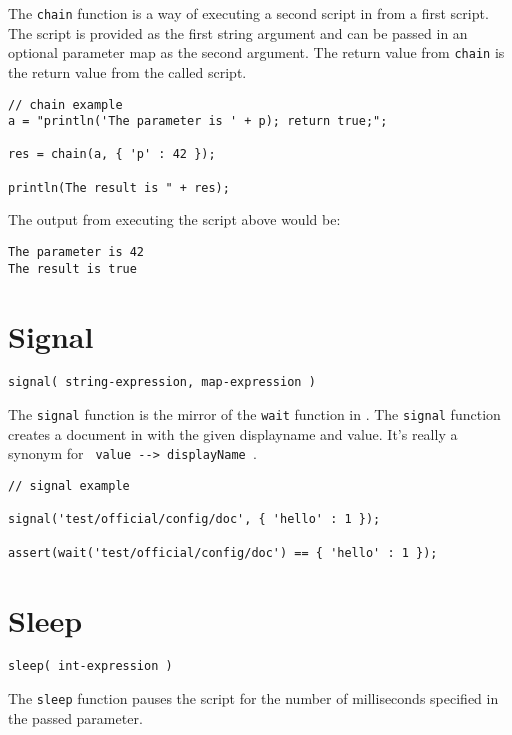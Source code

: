 The \Verb+chain+ function is a way of executing a second script in \Reflex from a first script. The script is provided as the first string argument and can be passed in an optional parameter map as the second argument. The return value from \verb+chain+ is the return value from the called script.

\begin{lstlisting}[caption={Chain example}]
// chain example
a = "println('The parameter is ' + p); return true;";

res = chain(a, { 'p' : 42 });

println(The result is " + res);

\end{lstlisting}

The output from executing the script above would be:
\begin{Verbatim}
The parameter is 42
The result is true
\end{Verbatim}

\section{Signal}

\begin{Verbatim}
signal( string-expression, map-expression )
\end{Verbatim}

The \Verb+signal+ function is the mirror of the \verb+wait+ function in \Reflex. The \verb+signal+ function creates a document in \Rapture with the given displayname and value. It's really a synonym for \verb+ value --> displayName +.

\begin{lstlisting}[caption={Signal example}]
// signal example

signal('test/official/config/doc', { 'hello' : 1 });

assert(wait('test/official/config/doc') == { 'hello' : 1 });

\end{lstlisting}

\section{Sleep}

\begin{Verbatim}
sleep( int-expression )
\end{Verbatim}

The \Verb+sleep+ function pauses the \Reflex script for the number of milliseconds specified in the passed parameter.

